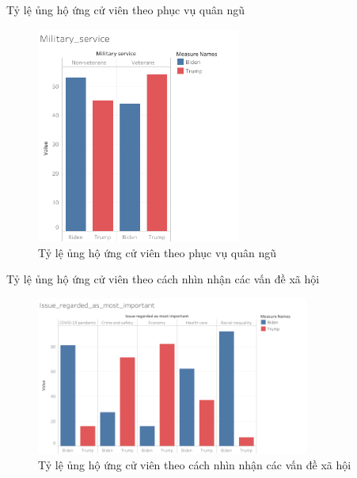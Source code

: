 \documentclass[10pt]{beamer}
\theoremstyle{remark}
\theoremstyle{definition}
\begin{document}
\begin{frame}{Tỷ lệ ủng hộ ứng cử viên theo phục vụ quân ngũ}
	\begin{figure}[h!]
        \centering
        \includegraphics[width=0.6\textwidth]{figures/Military_service.png}
        \caption{Tỷ lệ ủng hộ ứng cử viên theo phục vụ quân ngũ}
    \end{figure}
\end{frame}

\begin{frame}{Tỷ lệ ủng hộ ứng cử viên theo cách nhìn nhận các vấn đề xã hội}
	\begin{figure}[h!]
        \centering
        \includegraphics[width=0.8\textwidth]{figures/Issue_regarded_as_most_important.png}
        \caption{Tỷ lệ ủng hộ ứng cử viên theo cách nhìn nhận các vấn đề xã hội}
    \end{figure}
\end{frame}
\end{document}
